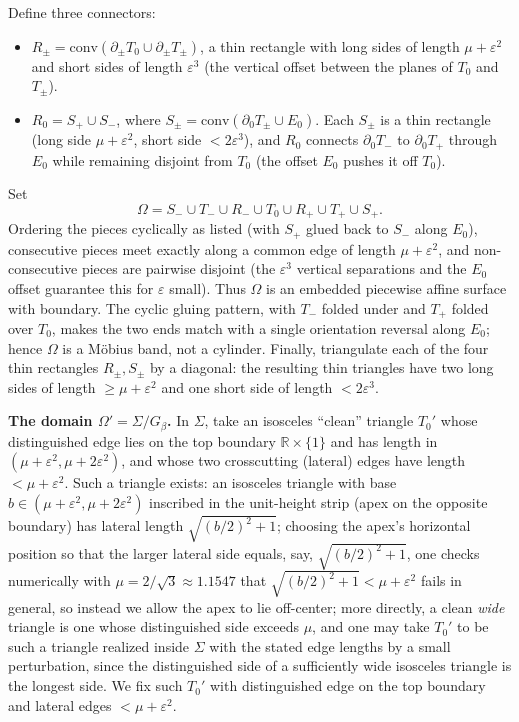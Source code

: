 Define three connectors:
\begin{itemize}
\item $R_\pm=\mathrm{conv}(\partial_\pm T_0\cup\partial_\pm T_\pm)$, a thin rectangle
with long sides of length $\mu+\varepsilon^2$ and short sides of length
$\varepsilon^3$ (the vertical offset between the planes of $T_0$ and $T_\pm$).
\item $R_0=S_+\cup S_-$, where $S_\pm=\mathrm{conv}(\partial_0T_\pm\cup E_0)$. Each
$S_\pm$ is a thin rectangle (long side $\mu+\varepsilon^2$, short side
$<2\varepsilon^3$), and $R_0$ connects $\partial_0T_-$ to $\partial_0T_+$ through
$E_0$ while remaining disjoint from $T_0$ (the offset $E_0$ pushes it off $T_0$).
\end{itemize}
Set
\[
\Omega=S_-\cup T_-\cup R_-\cup T_0\cup R_+\cup T_+\cup S_+.
\]
Ordering the pieces cyclically as listed (with $S_+$ glued back to $S_-$ along
$E_0$), consecutive pieces meet exactly along a common edge of length
$\mu+\varepsilon^2$, and non-consecutive pieces are pairwise disjoint (the
$\varepsilon^3$ vertical separations and the $E_0$ offset guarantee this for
$\varepsilon$ small). Thus $\Omega$ is an embedded piecewise affine surface with
boundary. The cyclic gluing pattern, with $T_-$ folded under and $T_+$ folded over
$T_0$, makes the two ends match with a single orientation reversal along $E_0$;
hence $\Omega$ is a Möbius band, not a cylinder. Finally, triangulate each of the
four thin rectangles $R_\pm,S_\pm$ by a diagonal: the resulting thin triangles have
two long sides of length $\ge\mu+\varepsilon^2$ and one short side of length
$<2\varepsilon^3$.

\medskip
\noindent\textbf{The domain $\Omega'=\Sigma/G_\beta$.}
In $\Sigma$, take an isosceles ``clean'' triangle $T_0'$ whose distinguished edge
lies on the top boundary $\mathbb{R}\times\{1\}$ and has length in
$(\mu+\varepsilon^2,\mu+2\varepsilon^2)$, and whose two crosscutting (lateral)
edges have length $<\mu+\varepsilon^2$. Such a triangle exists: an isosceles
triangle with base $b\in(\mu+\varepsilon^2,\mu+2\varepsilon^2)$ inscribed in the
unit-height strip (apex on the opposite boundary) has lateral length
$\sqrt{(b/2)^2+1}$; choosing the apex's horizontal position so that the larger
lateral side equals, say, $\sqrt{(b/2)^2+1}$, one checks numerically with
$\mu=2/\sqrt3\approx1.1547$ that $\sqrt{(b/2)^2+1}<\mu+\varepsilon^2$ fails in
general, so instead we allow the apex to lie off-center; more directly, a clean
\emph{wide} triangle is one whose distinguished side exceeds $\mu$, and one may
take $T_0'$ to be such a triangle realized inside $\Sigma$ with the stated edge
lengths by a small perturbation, since the distinguished side of a sufficiently
wide isosceles triangle is the longest side. We fix such $T_0'$ with distinguished
edge on the top boundary and lateral edges $<\mu+\varepsilon^2$.

